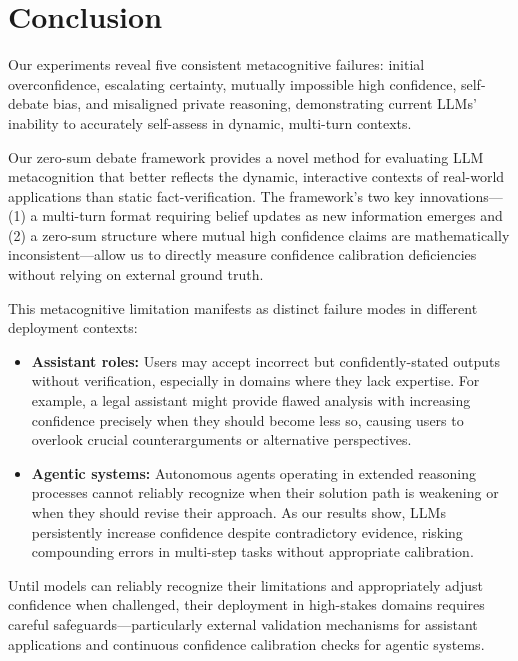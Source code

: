 \documentclass{article}
\begin{document}
\section{Conclusion}

Our experiments reveal five consistent metacognitive failures: initial overconfidence, escalating certainty, mutually impossible high confidence, self-debate bias, and misaligned private reasoning, demonstrating current LLMs' inability to accurately self-assess in dynamic, multi-turn contexts.

Our zero-sum debate framework provides a novel method for evaluating LLM metacognition that better reflects the dynamic, interactive contexts of real-world applications than static fact-verification. The framework's two key innovations— (1) a multi-turn format requiring belief updates as new information emerges and (2) a zero-sum structure where mutual high confidence claims are mathematically inconsistent—allow us to directly measure confidence calibration deficiencies without relying on external ground truth.

This metacognitive limitation manifests as distinct failure modes in different deployment contexts:
\begin{itemize}
    \item \textbf{Assistant roles:} Users may accept incorrect but confidently-stated outputs without verification, especially in domains where they lack expertise. For example, a legal assistant might provide flawed analysis with increasing confidence precisely when they should become less so, causing users to overlook crucial counterarguments or alternative perspectives.
    \item \textbf{Agentic systems:} Autonomous agents operating in extended reasoning processes cannot reliably recognize when their solution path is weakening or when they should revise their approach. As our results show, LLMs persistently increase confidence despite contradictory evidence, risking compounding errors in multi-step tasks without appropriate calibration.
\end{itemize}

Until models can reliably recognize their limitations and appropriately adjust confidence when challenged, their deployment in high-stakes domains requires careful safeguards—particularly external validation mechanisms for assistant applications and continuous confidence calibration checks for agentic systems.

\end{document}
